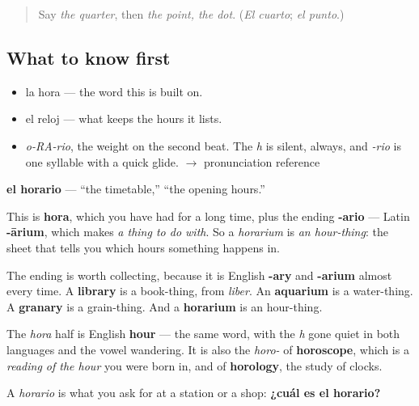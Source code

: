 \label{lesson:ES-C342-horario}



\begin{quote}
Say \emph{the quarter}, then \emph{the point, the dot}. (\emph{El cuarto}; \emph{el punto}.)
\end{quote}

\subsection*{What to know first}
\begin{itemize}
\raggedright
  \item la hora — the word this is built on.
  \item el reloj — what keeps the hours it lists.
\end{itemize}

\begin{sounds}
\begin{itemize}
\raggedright
  \item \emph{o-RA-rio}, the weight on the second beat. The \emph{h} is silent, always, and \emph{-rio} is one syllable with a quick glide. $\to$ pronunciation reference
\end{itemize}
\end{sounds}

\begin{cousinweb}
\textbf{el horario} — \textquotedblleft{}the timetable,\textquotedblright{} \textquotedblleft{}the opening hours.\textquotedblright{}

This is \textbf{hora}, which you have had for a long time, plus the ending \textbf{-ario} — Latin \textbf{-ārium}, which makes \emph{a thing to do with}. So a \emph{horarium} is \emph{an hour-thing}: the sheet that tells you which hours something happens in.

The ending is worth collecting, because it is English \textbf{-ary} and \textbf{-arium} almost every time. A \textbf{library} is a book-thing, from \emph{liber}. An \textbf{aquarium} is a water-thing. A \textbf{granary} is a grain-thing. And a \textbf{horarium} is an hour-thing.

The \emph{hora} half is English \textbf{hour} — the same word, with the \emph{h} gone quiet in both languages and the vowel wandering. It is also the \emph{horo-} of \textbf{horoscope}, which is a \emph{reading of the hour} you were born in, and of \textbf{horology}, the study of clocks.

A \emph{horario} is what you ask for at a station or a shop: \textbf{¿cuál es el horario?}
\end{cousinweb}

